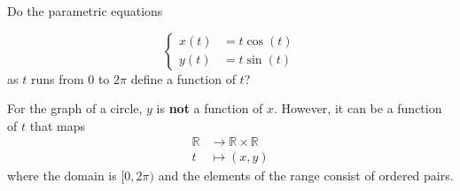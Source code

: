 \documentclass{ximera}
\begin{document}
\begin{question}
  Do the parametric equations

\[
\begin{cases}
x(t)&=t\cos(t) \\
y(t)&=t\sin(t)
\end{cases}
\]
  as $t$ runs from $0$ to $2\pi$ define a function of $t$?
  \begin{multipleChoice}
  \end{multipleChoice}
  \begin{feedback}
    For the graph of a circle, $y$ is \textbf{not} a function of
    $x$. However, it can be a function of $t$ that maps
    \begin{align*}
    \mathbb{R} &\to \mathbb{R} \times \mathbb{R}\\
    t &\mapsto (x,y)
    \end{align*}
    where the domain is $[0,2\pi)$ and the elements of the range
      consist of ordered pairs.
  \end{feedback}
\end{question}


%
\end{document}
